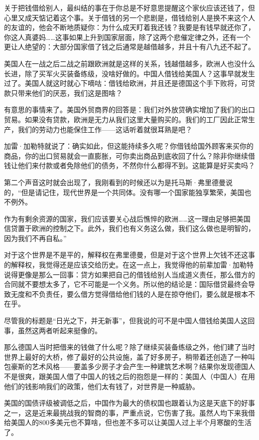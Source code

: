 关于把钱借给别人，最纠结的事在于你总是不好意思提醒这个家伙应该还钱了，但心里又成天惦记着这个事。关于借钱的另一个悲剧是，借钱给别人是换不来这个人的友谊的，他会不断地质疑你：为什么成天盯着我还钱？我要是有钱早就还你了，你这人真婆妈\ldots\ldots 这事如果上升到国家层面，除了这两个悲催定律之外，还有一个更让人绝望的：大部分国家借了钱之后通常是越借越多，并且十有八九还不起了。

美国人在一战之后二战之前跟欧洲就是这样的关系，钱越借越多，欧洲人也没什么长进，除了买军火买装备练级，没啥好做的。中国人借钱给美国人？这事早就发生过了。美国人就这时就心下嘀咕：借钱给欧洲，并且还是德国这个手下败将，可贷款只带来他们的厌恶，我们这是图啥？

有意思的事情来了。美国外贸商界的回答是：我们对外放贷确实增加了我们的出口贸易。如果没有贷款，欧洲是无力从我们这里大量购买的。我们的工厂因此正常生产，我们的劳动力也能保住工作------这话听着就很耳熟是吧？

加雷·加勒特就说了：确实如此，但这能持续多久呢？你借钱给国外顾客来买你的商品，你的出口贸易就会一直膨胀，可你卖出商品到底收回了什么？除非你继续借钱让他们来付款或者免除他们的债务，不然你什么都得不到。这能算是好买卖吗？

第二个声音这时就会出现了，我刚看到的时候还以为是托马斯·弗里德曼说的，``但是请记住，现代世界是一个共同体。没有哪一个国家能独享繁荣，美国也不例外。

作为有剩余资源的国家，我们应该要关心战后憔悴的欧洲\ldots\ldots 这一理由足够把美国信贷置于欧洲的控制之下。此外，我们也有义务这么做，我们这么做也是明智的，因为我们不再自私。''

对于这个世界是不是平的，解释权在弗里德曼，但是对于这个世界上欠钱不还这事的解释权，我觉得还是应该交给历史。在这一点上，我觉得他的前辈加雷·加勒特说得更像是那么一回事：贷方如果把自己的借钱给别人当成道义责任，那么借方的合同就不要想太多了，它不可能是一个义务。所以他的结论是：国际借贷最终会导致无度和不负责任，要么借方觉得借给他们钱的人是在掠夺他们，要么就是根本不在乎。

尽管我的标题是``日光之下，并无新事''，但我说的可不是中国人借钱给美国人这回事，虽然这两者听起来挺像的。

那么德国人当时把借来的钱做了什么呢？除了继续买装备练级之外，他们建了当时世界上最好的大桥，修了最好的公共设施，盖了好多房子，稍带着还创造了一种叫包豪斯的艺术风格------要盖多少房子才会产生一种建筑艺术啊？结果你发现德国人不是很爽，跟美国人借了中国人的钱之后的抱怨是一样的：美国人（中国人）在用他们的钱影响我们的政策，他们太有钱了，对世界是一种威胁。

美国的国债评级被调低之后，中国作为最大的债权国也跟着认为这是天底下的好事之一，这是近来最挑战我的智商的事，严重点说，它伤害了我。虽然人均下来我借给美国人的800多美元也不算啥，但也差不多可以让美国人过上半个月寒酸的生活了。

